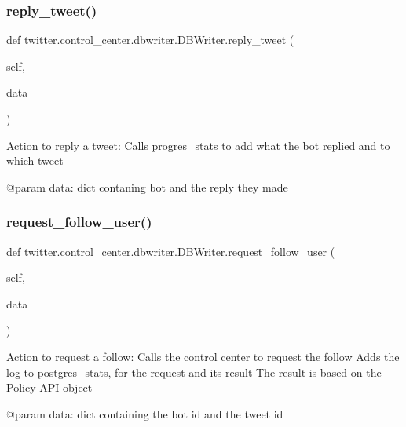 \subsubsection{\texorpdfstring{reply\+\_\+tweet()}{reply\_tweet()}}
{\footnotesize\ttfamily def twitter.\+control\+\_\+center.\+dbwriter.\+D\+B\+Writer.\+reply\+\_\+tweet (\begin{DoxyParamCaption}\item[{}]{self,  }\item[{}]{data }\end{DoxyParamCaption})}

\begin{DoxyVerb}Action to reply a tweet:
Calls progres_stats to add what the bot replied and to which tweet

@param data: dict contaning bot and the reply they made
\end{DoxyVerb}
 \mbox{\label{classtwitter_1_1control__center_1_1dbwriter_1_1DBWriter_a957daaa2da31d56fc7dccb9a18f3346d}} 
\subsubsection{\texorpdfstring{request\+\_\+follow\+\_\+user()}{request\_follow\_user()}}
{\footnotesize\ttfamily def twitter.\+control\+\_\+center.\+dbwriter.\+D\+B\+Writer.\+request\+\_\+follow\+\_\+user (\begin{DoxyParamCaption}\item[{}]{self,  }\item[{}]{data }\end{DoxyParamCaption})}

\begin{DoxyVerb}Action to request a follow:
Calls the control center to request the follow
Adds the log to postgres_stats, for the request and its result
The result is based on the Policy API object

@param data: dict containing the bot id and the tweet id
\end{DoxyVerb}
 \mbox{\label{classtwitter_1_1control__center_1_1dbwriter_1_1DBWriter_af94a869d95d271c9fc1d23b9281c95a9}} 
